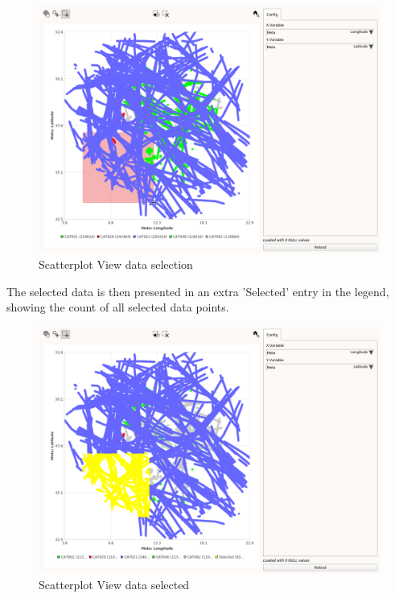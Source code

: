 \begin{figure}[H]
    \hspace*{-2cm}
    \includegraphics[width=18cm,frame]{figures/scatter_select.png}
  \caption{Scatterplot View data selection}
\end{figure}

The selected data is then presented in an extra 'Selected' entry in the legend, showing the count of all selected data points.

\begin{figure}[H]
    \hspace*{-2cm}
    \includegraphics[width=18cm,frame]{figures/scatter_selected.png}
  \caption{Scatterplot View data selected}
\end{figure}

